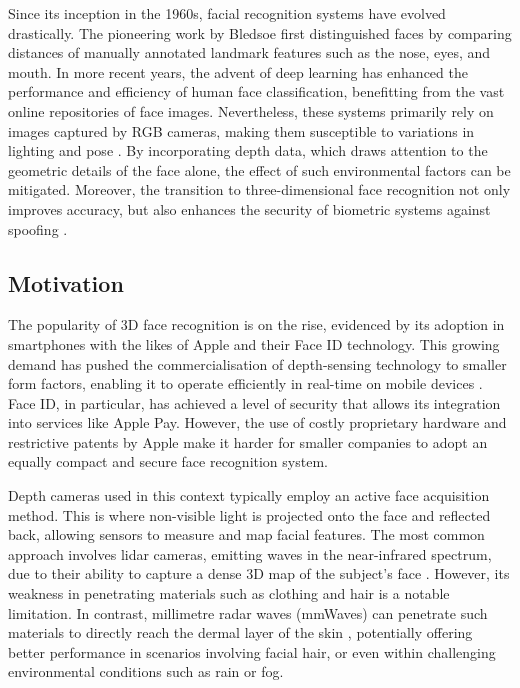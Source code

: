 \documentclass{mpaper}
\begin{document}
Since its inception in the 1960s, facial recognition systems have evolved drastically. The pioneering work by Bledsoe \cite{bledsoe1966model} first distinguished faces by comparing distances of manually annotated landmark features such as the nose, eyes, and mouth. In more recent years, the advent of deep learning has enhanced the performance and efficiency of human face classification, benefitting from the vast online repositories of face images.  Nevertheless, these systems primarily rely on images captured by RGB cameras, making them susceptible to variations in lighting and pose \cite{xu2004depth}. By incorporating depth data, which draws attention to the geometric details of the face alone, the effect of such environmental factors can be mitigated. Moreover, the transition to three-dimensional face recognition not only improves accuracy, but also enhances the security of biometric systems against spoofing \cite{wen2015face}.


\subsection{Motivation}
The popularity of 3D face recognition is on the rise, evidenced by its adoption in smartphones with the likes of Apple and their Face ID \cite{apple-faceid} technology. This growing demand has pushed the commercialisation of depth-sensing technology to smaller form factors, enabling it to operate efficiently in real-time on mobile devices \cite{soumya2023recent}. Face ID, in particular, has achieved a level of security that allows its integration into services like Apple Pay. However, the use of costly proprietary hardware and restrictive patents by Apple make it harder for smaller companies to adopt an equally compact and secure face recognition system.

Depth cameras used in this context typically employ an active face acquisition method. This is where non-visible light is projected onto the face and reflected back, allowing sensors to measure and map facial features. The most common approach involves lidar cameras, emitting waves in the near-infrared spectrum, due to their ability to capture a dense 3D map of the subject's face \cite{wang2020evolution}. However, its weakness in penetrating materials such as clothing and hair is a notable limitation. In contrast, millimetre radar waves (mmWaves) can penetrate such materials to directly reach the dermal layer of the skin \cite{vizard2006advances}, potentially offering better performance in scenarios involving facial hair, or even within challenging environmental conditions such as rain or fog.
\end{document}
